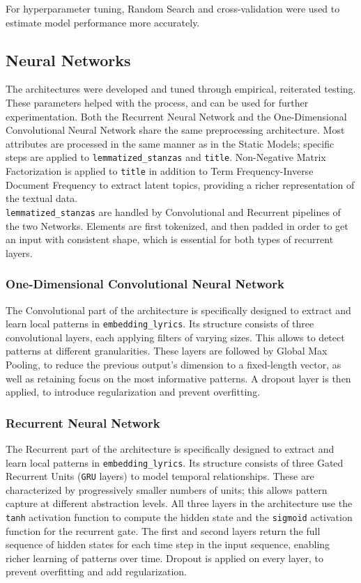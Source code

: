 For hyperparameter tuning, Random Search and cross-validation were used to
estimate model performance more accurately.

\subsection*{Neural Networks}
The architectures were developed and tuned through empirical,
reiterated testing. These parameters helped with the process, and can
be used for further experimentation.
Both the Recurrent Neural Network and the One-Dimensional Convolutional
Neural Network share the same preprocessing
architecture. Most attributes are processed in the same manner as in
the Static Models; specific steps are applied to \texttt{lemmatized\_stanzas}
and \texttt{title}.
Non-Negative Matrix Factorization is applied to \texttt{title} in addition to
Term Frequency-Inverse Document Frequency
to extract latent topics, providing a richer representation of the
textual data.\\

\texttt{lemmatized\_stanzas} are handled by Convolutional and Recurrent
pipelines of the two Networks.
Elements are first tokenized, and then padded in order to
get an input with consistent shape, which is essential for both types of
recurrent layers.

\subsubsection*{One-Dimensional Convolutional Neural Network}
The Convolutional part of the architecture is specifically designed to extract and learn
local patterns in \texttt{embedding\_lyrics}.
Its structure consists of three convolutional layers, each applying filters of
varying sizes. This allows to detect patterns at different granularities.
These layers are followed by Global Max Pooling, to reduce the previous output's
dimension to a fixed-length vector, as well as retaining focus on the most
informative patterns.
A dropout layer is then applied, to introduce regularization and prevent
overfitting.

\subsubsection*{Recurrent Neural Network}
The Recurrent part of the architecture is specifically designed to extract and learn
local patterns in \texttt{embedding\_lyrics}.
Its structure consists of three Gated Recurrent Units (\texttt{GRU} layers)
to model temporal relationships. These are characterized by progressively smaller
numbers of units; this allows pattern capture at different abstraction levels.
All three layers in the architecture use the \texttt{tanh} activation function
to compute the hidden state and
the \texttt{sigmoid} activation function for the recurrent gate.
The first and second layers return the full sequence of hidden states for each
time step in the input sequence, enabling richer learning of patterns over time.
Dropout is applied on every layer, to prevent overfitting and add regularization.

